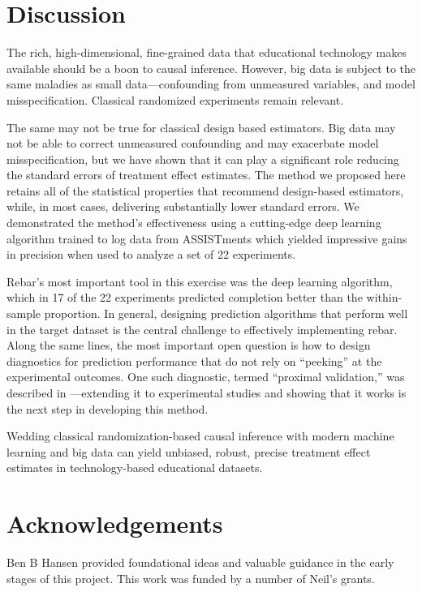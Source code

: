 \documentclass{edm_template}
\begin{document}
\section{Discussion}\label{sec:discussion}
The rich, high-dimensional, fine-grained data that educational technology makes available should be a boon to causal inference.
However, big data is subject to the same maladies as small data---confounding from unmeasured variables, and model misspecification.
Classical randomized experiments remain relevant.

The same may not be true for classical design based estimators.
Big data may not be able to correct unmeasured confounding and may exacerbate model misspecification, but we have shown that it can play a significant role reducing the standard errors of treatment effect estimates. 
The method we proposed here retains all of the statistical properties that recommend design-based estimators, while, in most cases, delivering substantially lower standard errors. 
We demonstrated the method's effectiveness using a cutting-edge deep learning algorithm trained to log data from ASSISTments which yielded impressive gains in precision when used to analyze a set of 22 experiments.

Rebar's most important tool in this exercise was the deep learning algorithm, which in 17 of the 22 experiments predicted completion better than the within-sample proportion.
In general, designing prediction algorithms that perform well in the target dataset is the central challenge to effectively implementing rebar. 
Along the same lines, the most important open question is how to design diagnostics for prediction performance that do not rely on ``peeking'' at the experimental outcomes. 
One such diagnostic, termed ``proximal validation,'' was described in \cite{salesRebar}---extending it to experimental studies and showing that it works is the next step in developing this method. 

Wedding classical randomization-based causal inference with modern machine learning and big data can yield unbiased, robust, precise treatment effect estimates in technology-based educational datasets. 

\section{Acknowledgements}
Ben B Hansen provided foundational ideas and valuable guidance in the early stages of this project. This work was funded by a number of Neil's grants.


  
\end{document}
